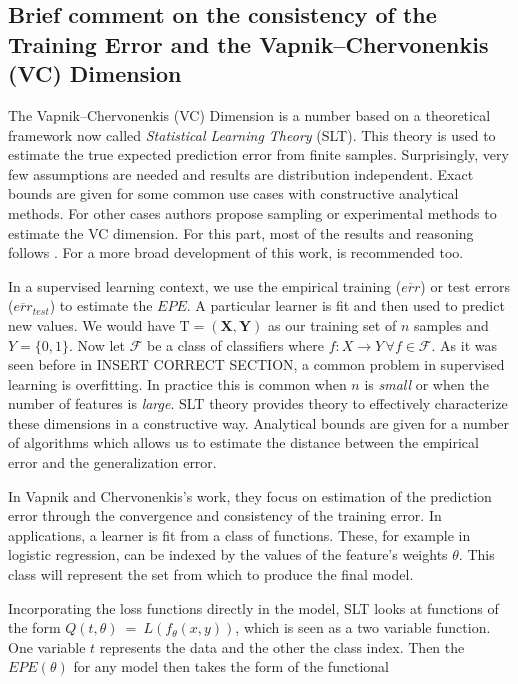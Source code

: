 

\subsection{Brief comment on the consistency of the Training Error and the Vapnik–Chervonenkis (VC) Dimension} \label{section-VcDimension}

\cite{vapnik-nature2013}
\cite{cherkassky-learning2007}

The Vapnik–Chervonenkis (VC) Dimension is a number based on a theoretical framework now called \textit{Statistical Learning Theory} (SLT). This theory is used to estimate the true expected prediction error from finite samples. Surprisingly, very few assumptions are needed and results are distribution independent. Exact bounds are given for some common use cases with constructive analytical methods. For other cases authors propose sampling or experimental methods to estimate the VC dimension. For this part, most of the results and reasoning follows \cite{cherkassky-learning2007}. For a more broad development of this work, \cite{vapnik-nature2013} is recommended too.

In a supervised learning context, we use the empirical training ($\overline{err}$) or test errors ($\overline{err}_{test}$) to estimate the $EPE$. A particular learner is fit and then used to predict new values. We would have $\mathrm{T} = (\textbf{X},\textbf{Y})$ as our training set of $n$ samples   and $Y = \{0,1 \}$. Now let $\mathcal {F}$ be a class of classifiers where $f: X \rightarrow Y \, \forall f \in \mathcal {F}$. As it was seen before in INSERT CORRECT SECTION, a common problem in supervised learning is overfitting. In practice this is common when $n$ is \textit{small} or when the number of features is \textit{large}. SLT theory provides theory to effectively characterize these dimensions in a constructive way. Analytical bounds are given for a number of algorithms which allows us to estimate the distance between the empirical error and the generalization error.

In Vapnik and Chervonenkis's work, they focus on estimation of the prediction error through the convergence and consistency of the training error. In applications, a learner is fit from a class of functions. These, for example in logistic regression, can be indexed by the values of the feature's weights $\theta$. This class will represent the set from which to produce the final model.

Incorporating the loss functions directly in the model, SLT looks at functions of the form $Q(t,\theta) \ = \ L(f_\theta(x,y))$, which is seen as a two variable function. One variable $t$ represents the data and the other the class index. Then the $EPE(\theta)$ for any model then takes the form of the functional

